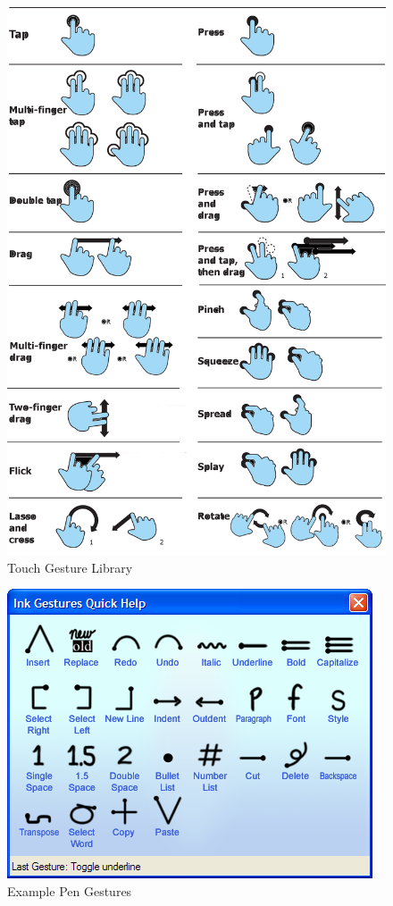 \documentclass[12pt]{article}
\begin{document}
\begin{figure}
\includegraphics[width=0.9\linewidth]{GestureLibrary}
\caption{Touch Gesture Library}
\end{figure}
\begin{figure}
\includegraphics[width=0.9\linewidth]{pengestures}
\caption{Example Pen Gestures}
\end{figure}
\end{document}

